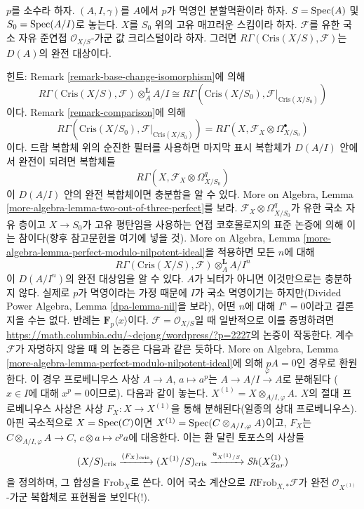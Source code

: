 \begin{remark}[완전성]
\label{remark-perfect}
$p$를 소수라 하자. $(A, I, \gamma)$를 $A$에서 $p$가 멱영인
분할멱환이라 하자. $S = \mathop{\mathrm{Spec}}(A)$ 및 $S_0 = \mathop{\mathrm{Spec}}(A/I)$로 놓는다.
$X$를 $S_0$ 위의 고유 매끄러운 스킴이라 하자. $\mathcal{F}$를
유한 국소 자유 준연접 $\mathcal{O}_{X/S}$-가군 값 크리스털이라
하자. 그러면 $R\Gamma(\text{Cris}(X/S), \mathcal{F})$는
$D(A)$의 완전 대상이다.

\medskip\noindent
힌트: Remark \ref{remark-base-change-isomorphism}에 의해
$$
R\Gamma(\text{Cris}(X/S), \mathcal{F}) \otimes_A^\mathbf{L} A/I
\cong
R\Gamma(\text{Cris}(X/S_0), \mathcal{F}|_{\text{Cris}(X/S_0)})
$$
이다. Remark \ref{remark-comparison}에 의해
$$
R\Gamma(\text{Cris}(X/S_0), \mathcal{F}|_{\text{Cris}(X/S_0)}) =
R\Gamma(X, \mathcal{F}_X \otimes \Omega^\bullet_{X/S_0})
$$
이다. 드람 복합체 위의 순진한 필터를 사용하면 마지막 표시
복합체가 $D(A/I)$ 안에서 완전이 되려면 복합체들
$$
R\Gamma(X, \mathcal{F}_X \otimes \Omega^q_{X/S_0})
$$
이 $D(A/I)$ 안의 완전 복합체이면 충분함을 알 수 있다. More on
Algebra, Lemma \ref{more-algebra-lemma-two-out-of-three-perfect}를 보라.
$\mathcal{F}_X \otimes \Omega^q_{X/S_0}$가 유한 국소 자유 층이고
$X \to S_0$가 고유 평탄임을 사용하는 연접 코호몰로지의 표준
논증에 의해 이는 참이다(향후 참고문헌을 여기에 넣을 것). More on
Algebra, Lemma \ref{more-algebra-lemma-perfect-modulo-nilpotent-ideal}을
적용하면 모든 $n$에 대해
$$
R\Gamma(\text{Cris}(X/S), \mathcal{F}) \otimes_A^\mathbf{L} A/I^n
$$
이 $D(A/I^n)$의 완전 대상임을 알 수 있다. $A$가 뇌터가 아니면
이것만으로는 충분하지 않다. 실제로 $p$가 멱영이라는 가정 때문에
$I$가 국소 멱영이기는 하지만(Divided Power Algebra, Lemma
\ref{dpa-lemma-nil}을 보라), 어떤 $n$에 대해 $I^n = 0$이라고
결론지을 수는 없다. 반례는 $\mathbf{F}_p\langle x \rangle$이다.
$\mathcal{F} = \mathcal{O}_{X/S}$일 때 일반적으로 이를 증명하려면
\url{https://math.columbia.edu/~dejong/wordpress/?p=2227}의 논증이
작동한다. 계수 $\mathcal{F}$가 자명하지 않을 때
\cite{Faltings-very}의 논증은 다음과 같은 듯하다. More on Algebra,
Lemma \ref{more-algebra-lemma-perfect-modulo-nilpotent-ideal}에 의해
$pA = 0$인 경우로 환원한다. 이 경우 프로베니우스 사상
$A \to A$, $a \mapsto a^p$는
$A \to A/I \xrightarrow{\varphi} A$로 분해된다
($x \in I$에 대해 $x^p = 0$이므로). 다음과 같이 놓는다.
$X^{(1)} = X \otimes_{A/I, \varphi} A$. $X$의 절대 프로베니우스
사상은 사상 $F_X : X \to X^{(1)}$을 통해 분해된다(일종의 상대
프로베니우스). 아핀 국소적으로 $X = \mathop{\mathrm{Spec}}(C)$이면
$X^{(1)} = \mathop{\mathrm{Spec}}( C \otimes_{A/I, \varphi} A)$이고, $F_X$는
$C \otimes_{A/I, \varphi} A \to C$,
$c \otimes a \mapsto c^pa$에 대응한다. 이는 환 달린 토포스의 사상들
$$
(X/S)_{\text{cris}}
\xrightarrow{(F_X)_{\text{cris}}}
(X^{(1)}/S)_{\text{cris}}
\xrightarrow{u_{X^{(1)}/S}}
\mathop{\mathit{Sh}}\nolimits(X^{(1)}_{Zar})
$$
을 정의하며, 그 합성을 $\text{Frob}_X$로 쓴다. 이어 국소 계산으로
$R\text{Frob}_{X, *}\mathcal{F}$가 완전
$\mathcal{O}_{X^{(1)}}$-가군 복합체로 표현됨을 보인다(!).
\end{remark}

